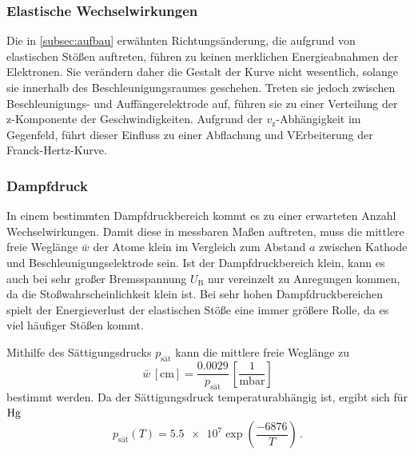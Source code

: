 \subsubsection{Elastische Wechselwirkungen}

Die in \autoref{subsec:aufbau} erwähnten Richtungsänderung, die aufgrund von elastischen Stößen auftreten,
führen zu keinen merklichen Energieabnahmen der Elektronen. 
Sie verändern daher die Gestalt der Kurve nicht wesentlich, solange sie innerhalb des Beschleunigungsraumes geschehen.
Treten sie jedoch zwischen Beschleunigungs- und Auffängerelektrode auf, führen sie zu einer Verteilung der z-Komponente der Geschwindigkeiten.
Aufgrund der $v_\text{z}$-Abhängigkeit im Gegenfeld, führt dieser Einfluss zu einer Abflachung und VErbeiterung der Franck-Hertz-Kurve.


\subsubsection{Dampfdruck}

In einem bestimmten Dampfdruckbereich kommt es zu einer erwarteten Anzahl Wechselwirkungen.
Damit diese in messbaren Maßen auftreten, muss die mittlere freie Weglänge $\bar{w}$ der Atome klein im Vergleich
zum Abstand $a$ zwischen Kathode und Beschleunigungselektrode sein. 
Ist der Dampfdruckbereich klein, kann es auch bei sehr großer Bremsspannung $U_\text{B}$ nur vereinzelt zu Anregungen kommen, 
da die Stoßwahrscheinlichkeit klein ist. 
Bei sehr hohen Dampfdruckbereichen spielt der Energieverlust der elastischen Stöße eine immer größere Rolle, 
da es viel häufiger Stößen kommt.

Mithilfe des Sättigungsdrucks $p_\text{sät}$ kann die mittlere freie Weglänge zu
\begin{equation}
    \bar{w} \, [\unit{\centi\meter}] = \frac{0.0029}{p_\text{sät}} \, \left[ \frac{1}{\unit{\milli\bar}}\right]
\end{equation}
bestimmt werden.
Da der Sättigungsdruck temperaturabhängig ist, ergibt sich für $\ce{Hg}$ 
\begin{equation}
    p_\text{sät}(T) = \num{5.5e7} \exp{\left( \frac{-6876}{T} \right)} \, .
\end{equation}